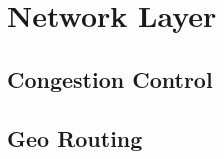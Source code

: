 \chapter{Network Layer\label{chap:networklayer}}
\section{Congestion Control\label{sec:congestioncontrol}}
\section{Geo Routing\label{sec:georouting}}
